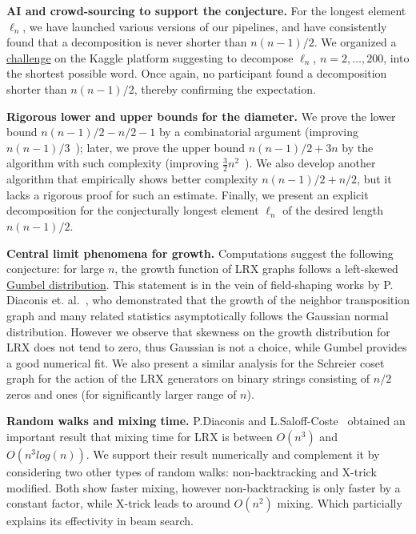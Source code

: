 \documentclass[reqno,11pt]{amsart}
\begin{document}
{\bf AI and crowd-sourcing to support the conjecture.} For the longest element $\ell_n$, we have launched various versions of our pipelines, and have consistently found that a decomposition is never shorter than $n(n-1)/2$. We organized a \href{https://www.kaggle.com/competitions/lrx-oeis-a-186783-brainstorm-math-conjecture/overview}{challenge} on the Kaggle platform suggesting to decompose $\ell_n$, $n=2, \ldots, 200$, into the shortest possible word.
Once again, no participant found a decomposition shorter than $n(n-1)/2$, thereby confirming the expectation.

{\bf Rigorous lower and upper bounds for the diameter.} We prove the lower bound $n(n-1)/2 - n/2-1$ by a combinatorial argument (improving $n(n-1)/3$~\cite{babai1989small}); later, we prove the upper bound $n(n-1)/2 +3n$ by the algorithm with such complexity (improving $\frac 32 n^2$~\cite{kuppili2020upper}). %
We also develop another algorithm that empirically shows better complexity $n(n-1)/2 + n/2$, but it lacks a rigorous proof for such an estimate.  
Finally, we present an explicit decomposition for the conjecturally longest element $\ell_n$ of the desired length $n(n-1)/2$. 

{\bf Central limit phenomena for growth.} 
Computations suggest the following conjecture: for large $n$, the growth function of LRX graphs follows a left-skewed \href{https://en.wikipedia.org/wiki/Gumbel_distribution}{Gumbel distribution}. This statement is in the vein of field-shaping works by P. Diaconis et. al.~\cite{diaconis1977spearman, diaconis1988metrics,chatterjee2017central}, who demonstrated that the growth of the neighbor transposition graph and many related statistics asymptotically follows the Gaussian normal distribution.
However we observe that skewness on the growth distribution for LRX does not tend to zero, thus Gaussian is not a choice, while Gumbel provides a good numerical fit. We also present a similar analysis for the Schreier coset graph for the action of the LRX generators on binary strings consisting of $n/2$ zeros and ones (for significantly larger range of $n$).

{\bf Random walks and mixing time.}
P.Diaconis and L.Saloff-Coste~\cite{diaconis1993comparison} obtained an important result that mixing time for LRX
is between $O(n^3)$ and $O(n^3log(n))$. We support their result numerically and complement it by considering two other types
of random walks: non-backtracking and X-trick modified. Both show faster mixing, however non-backtracking is only faster 
by a constant  factor, while X-trick leads to around $O(n^2)$ mixing. Which particially explains its effectivity in beam search.
\end{document}

